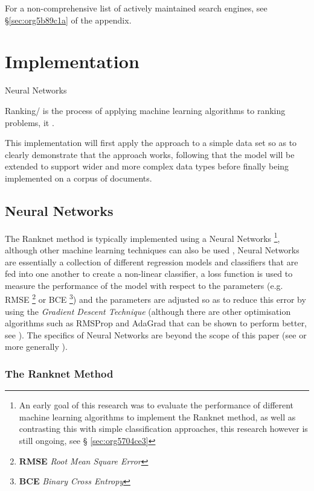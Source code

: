 \documentclass[a4paper,11pt,twoside]{article}
\begin{document}
For a non-comprehensive list of actively maintained search engines,
see \S \ref{sec:org5b89c1a} of the appendix.

\section{Implementation}
\label{sec:org3d4172e}



Neural Networks 

Ranking/ is the process of applying machine learning algorithms to
ranking problems, it .

This implementation will first apply the approach to a simple data
set so as to clearly demonstrate that the approach works, following
that the model will be extended to support wider and more complex
data types before finally being implemented on a corpus of documents.

\subsection{Neural Networks}
\label{sec:org29a50db}

The Ranknet method is typically implemented using a Neural Networks
\footnote{An early goal of this research was to evaluate the performance
of different machine learning algorithms to implement the Ranknet
method, as well as contrasting this with simple classification
approaches, this research however is still ongoing,  see \S
\ref{sec:org5704ce3}},
although other machine learning techniques can also be used
\cite[p. 1]{christopherburgesRankNetRankingRetrospective2015},
Neural Networks are essentially a collection of different
regression models and classifiers that are fed into one another to create a
non-linear classifier, a loss function is used to measure the
performance of the model with respect to the parameters
(e.g. RMSE \footnote{\textbf{RMSE} \emph{Root Mean Square Error}} or BCE \footnote{\textbf{BCE} \emph{Binary Cross Entropy}}) and the parameters are adjusted so
as to reduce this error by using the \emph{Gradient Descent Technique}
(although there are other optimisation algorithms such as RMSProp
and AdaGrad \cite{mukkamalaVariantsRMSPropAdagrad2017} that can be
shown to perform better, see
\cite{bushaevUnderstandingRMSpropFaster2018}). The specifics of
Neural Networks are beyond the scope of this paper (see
\cite{hmkcodeBackpropagationStepStep} or more generally \cite{pictonNeuralNetworks1994}).

\subsubsection{The Ranknet Method}
\label{sec:org5105a0b}
\end{document}
